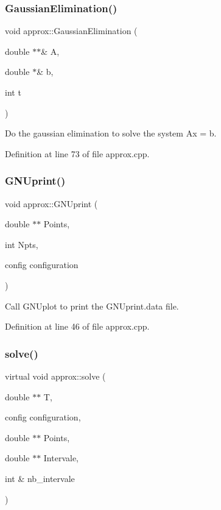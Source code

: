 \subsubsection{\texorpdfstring{Gaussian\+Elimination()}{GaussianElimination()}}
{\footnotesize\ttfamily void approx\+::\+Gaussian\+Elimination (\begin{DoxyParamCaption}\item[{double $\ast$$\ast$\&}]{A,  }\item[{double $\ast$\&}]{b,  }\item[{int}]{t }\end{DoxyParamCaption})}



Do the gaussian elimination to solve the system Ax = b. 



Definition at line 73 of file approx.\+cpp.

\mbox{\label{classapprox_a4c392064b5f2c9cd4ba96ade669571c1}} 
\subsubsection{\texorpdfstring{G\+N\+Uprint()}{GNUprint()}}
{\footnotesize\ttfamily void approx\+::\+G\+N\+Uprint (\begin{DoxyParamCaption}\item[{double $\ast$$\ast$}]{Points,  }\item[{int}]{Npts,  }\item[{config}]{configuration }\end{DoxyParamCaption})}



Call G\+N\+Uplot to print the G\+N\+Uprint.\+data file. 



Definition at line 46 of file approx.\+cpp.

\mbox{\label{classapprox_a56625b15475b445d745951979beb33cd}} 
\subsubsection{\texorpdfstring{solve()}{solve()}}
{\footnotesize\ttfamily virtual void approx\+::solve (\begin{DoxyParamCaption}\item[{double $\ast$$\ast$}]{T,  }\item[{config}]{configuration,  }\item[{double $\ast$$\ast$}]{Points,  }\item[{double $\ast$$\ast$}]{Intervale,  }\item[{int \&}]{nb\+\_\+intervale }\end{DoxyParamCaption})\hspace{0.3cm}{\ttfamily [pure virtual]}}

